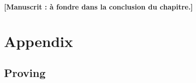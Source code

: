 \documentclass[preprint]{elsarticle}
\begin{document}
\textbf{[Manuscrit : à fondre dans la conclusion du chapitre.]}

\section{Appendix}\label{sec:appendix}

\subsection[]{Proving }\label{sec:errors_inverse_Gram}
\end{document}
